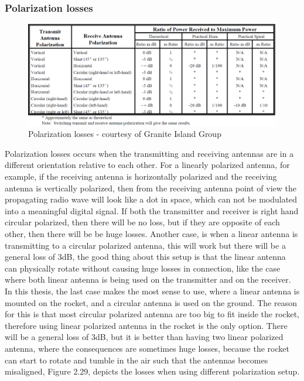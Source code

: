 \newpage

\subsubsection{Polarization losses}
\begin{figure}[h]
\hspace{-2.5cm}
\includegraphics[scale=0.5]{figures/PolarizationLoss.PNG}
\caption{Polarization losses - courtesy of Granite Island Group \cite{gig}}
\end{figure}

Polarization losses occurs when the transmitting and receiving antennas are in a different orientation relative to each other. For a linearly polarized antenna, for example, if the receiving antenna is horizontally polarized and the receiving antenna is vertically polarized, then from the receiving antenna point of view the propagating radio wave will look like a dot in space, which can not be modulated into a meaningful digital signal. If both the transmitter and receiver is right hand circular polarized, then there will be no loss, but if they are opposite of each other, then there will be be huge losses. Another case, is when a linear antenna is transmitting to a circular polarized antenna, this will work but there will be a general loss of 3dB, the good thing about this setup is that the linear antenna can physically rotate without causing huge losses in connection, like the case where both linear antenna is being used on the transmitter and on the receiver. In this thesis, the last case makes the most sense to use, where a linear antenna is mounted on the rocket, and a circular antenna is used on the ground. The reason for this is that most circular polarized antenna are too big to fit inside the rocket, therefore using linear polarized antenna in the rocket is the only option. There will be a general loss of 3dB, but it is better than having two linear polarized antenna, where the consequences are sometimes huge losses, because the rocket can start to rotate and tumble in the air such that the antennas becomes misaligned, Figure 2.29, depicts the losses when using different polarization setup.  

